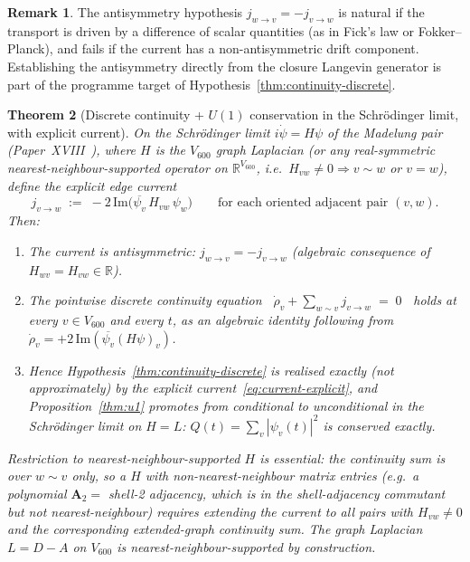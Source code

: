 \documentclass[11pt]{article}
\newtheorem{theorem}{Theorem}[section]
\theoremstyle{definition}
\newtheorem{remark}[theorem]{Remark}
\newcommand{\R}{\mathbb{R}}
\begin{document}
\begin{remark}
The antisymmetry hypothesis $j_{w \to v} = -j_{v \to w}$ is natural if the transport is driven by a difference of scalar quantities (as in Fick's law or Fokker--Planck), and fails if the current has a non-antisymmetric drift component. Establishing the antisymmetry directly from the closure Langevin generator is part of the programme target of Hypothesis~\ref{thm:continuity-discrete}.
\end{remark}

\begin{theorem}[Discrete continuity + $U(1)$ conservation in the Schr\"{o}dinger limit, with explicit current]\label{thm:u1-explicit}
On the Schr\"{o}dinger limit $i\dot\psi = H\psi$ of the Madelung pair (Paper~XVIII~\citep{SmartXVIII}), where $H$ is the $V_{600}$ graph Laplacian (or any real-symmetric \emph{nearest-neighbour-supported} operator on $\R^{V_{600}}$, i.e.\ $H_{vw} \neq 0 \Rightarrow v \sim w$ or $v = w$), define the explicit edge current
\begin{equation}\label{eq:current-explicit}
   j_{v \to w} \;:=\; -2\,\mathrm{Im}\bigl(\overline{\psi_v}\, H_{vw}\, \psi_w\bigr)
   \qquad\text{for each oriented adjacent pair }(v, w).
\end{equation}
Then:
\begin{enumerate}
\item The current is antisymmetric: $j_{w \to v} = -j_{v \to w}$ (algebraic consequence of $H_{wv} = H_{vw} \in \R$).
\item The pointwise discrete continuity equation
$\;\;\dot\rho_v + \sum_{w \sim v} j_{v \to w} \;=\; 0\;\;$
holds at every $v \in V_{600}$ and every $t$, as an algebraic identity following from $\dot\rho_v = +2\,\mathrm{Im}(\overline{\psi_v}(H\psi)_v)$.
\item Hence Hypothesis~\ref{thm:continuity-discrete} is realised \emph{exactly} (not approximately) by the explicit current~\eqref{eq:current-explicit}, and Proposition~\ref{thm:u1} promotes from conditional to unconditional in the Schr\"{o}dinger limit on $H = L$: $Q(t) = \sum_v|\psi_v(t)|^2$ is conserved exactly.
\end{enumerate}

\noindent\emph{Restriction to nearest-neighbour-supported $H$ is essential}: the continuity sum is over $w \sim v$ only, so a $H$ with non-nearest-neighbour matrix entries (e.g.\ a polynomial $\mathbf{A}_2 = $ shell-2 adjacency, which is in the shell-adjacency commutant but not nearest-neighbour) requires extending the current to all pairs with $H_{vw} \neq 0$ and the corresponding extended-graph continuity sum. The graph Laplacian $L = D - A$ on $V_{600}$ is nearest-neighbour-supported by construction.
\end{theorem}
\end{document}
